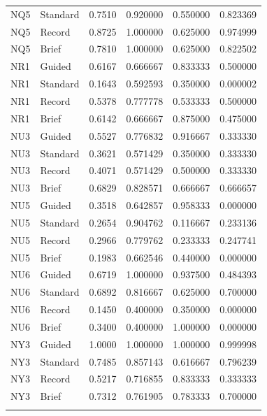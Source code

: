 \begin{longtable}{@{}llrrrr@{}}
NQ5 & Standard & 0.7510 & 0.920000 & 0.550000 & 0.823369 \\
NQ5 & Record & 0.8725 & 1.000000 & 0.625000 & 0.974999 \\
NQ5 & Brief & 0.7810 & 1.000000 & 0.625000 & 0.822502 \\
\addlinespace[3pt]
NR1 & Guided & 0.6167 & 0.666667 & 0.833333 & 0.500000 \\
NR1 & Standard & 0.1643 & 0.592593 & 0.350000 & 0.000002 \\
NR1 & Record & 0.5378 & 0.777778 & 0.533333 & 0.500000 \\
NR1 & Brief & 0.6142 & 0.666667 & 0.875000 & 0.475000 \\
\addlinespace[3pt]
NU3 & Guided & 0.5527 & 0.776832 & 0.916667 & 0.333330 \\
NU3 & Standard & 0.3621 & 0.571429 & 0.350000 & 0.333330 \\
NU3 & Record & 0.4071 & 0.571429 & 0.500000 & 0.333330 \\
NU3 & Brief & 0.6829 & 0.828571 & 0.666667 & 0.666657 \\
\addlinespace[3pt]
NU5 & Guided & 0.3518 & 0.642857 & 0.958333 & 0.000000 \\
NU5 & Standard & 0.2654 & 0.904762 & 0.116667 & 0.233136 \\
NU5 & Record & 0.2966 & 0.779762 & 0.233333 & 0.247741 \\
NU5 & Brief & 0.1983 & 0.662546 & 0.440000 & 0.000000 \\
\addlinespace[3pt]
NU6 & Guided & 0.6719 & 1.000000 & 0.937500 & 0.484393 \\
NU6 & Standard & 0.6892 & 0.816667 & 0.625000 & 0.700000 \\
NU6 & Record & 0.1450 & 0.400000 & 0.350000 & 0.000000 \\
NU6 & Brief & 0.3400 & 0.400000 & 1.000000 & 0.000000 \\
\addlinespace[3pt]
NY3 & Guided & 1.0000 & 1.000000 & 1.000000 & 0.999998 \\
NY3 & Standard & 0.7485 & 0.857143 & 0.616667 & 0.796239 \\
NY3 & Record & 0.5217 & 0.716855 & 0.833333 & 0.333333 \\
NY3 & Brief & 0.7312 & 0.761905 & 0.783333 & 0.700000 \\
\addlinespace[3pt]
\end{longtable}
\endgroup
